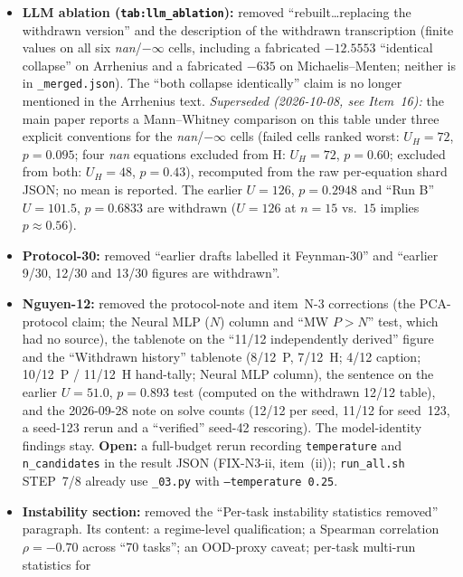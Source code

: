 \documentclass[11pt]{article}
\begin{document}
\begin{itemize}
rate; flag rate 46/74 on the previous file, 45/74 = $60.8\,\%$ on the canonical file), Pure~LLM mean $-0.7571$, and Neural~MLP median
$-0.4675$, mean $-0.9482$, $5.4/12.2\,\%$, 0 catastrophic.
\item \textbf{LLM ablation (\texttt{tab:llm\_ablation}):} removed ``rebuilt\ldots replacing the withdrawn version'' and the description of
the withdrawn transcription (finite values on all six \textit{nan}/$-\infty$ cells, including a fabricated $-12.5553$ ``identical collapse''
on Arrhenius and a fabricated $-635$ on Michaelis--Menten; neither is in \texttt{\_merged.json}). The ``both collapse identically''
claim is no longer mentioned in the Arrhenius text. \emph{Superseded (2026-10-08, see Item~16):} the main paper reports a Mann--Whitney comparison on this table under three explicit
conventions for the \textit{nan}/$-\infty$ cells (failed cells ranked worst: $U_H=72$, $p=0.095$; four \textit{nan} equations excluded from H:
$U_H=72$, $p=0.60$; excluded from both: $U_H=48$, $p=0.43$), recomputed from the raw per-equation shard JSON; no mean is reported. The earlier
$U=126$, $p=0.2948$ and ``Run B'' $U=101.5$, $p=0.6833$ are withdrawn ($U=126$ at $n=15$ vs.\ $15$ implies $p\approx0.56$).
\item \textbf{Protocol-30:} removed ``earlier drafts labelled it Feynman-30'' and ``earlier 9/30, 12/30 and 13/30 figures are withdrawn''.
\item \textbf{Nguyen-12:} removed the protocol-note and item~N-3 corrections (the PCA-protocol claim; the Neural MLP ($N$) column and
``MW $P{>}N$'' test, which had no source), the tablenote on the ``11/12 independently derived'' figure and the ``Withdrawn history''
tablenote (8/12~P, 7/12~H; 4/12 caption; 10/12~P / 11/12~H hand-tally; Neural MLP column), the sentence on the earlier
$U=51.0$, $p=0.893$ test (computed on the withdrawn 12/12 table), and the 2026-09-28 note on solve counts (12/12 per seed, 11/12 for seed~123,
a seed-123 rerun and a ``verified'' seed-42 rescoring). The model-identity findings stay. \textbf{Open:} a full-budget rerun recording
\texttt{temperature} and \texttt{n\_candidates} in the result JSON (FIX-N3-ii, item~(ii)); \texttt{run\_all.sh} STEP~7/8 already use
\texttt{\_03.py} with \texttt{--temperature 0.25}.
\item \textbf{Instability section:} removed the ``Per-task instability statistics removed'' paragraph. Its content: a regime-level
qualification; a Spearman correlation $\rho=-0.70$ across ``70 tasks''; an OOD-proxy caveat; per-task multi-run statistics for

\end{itemize}
\end{document}
